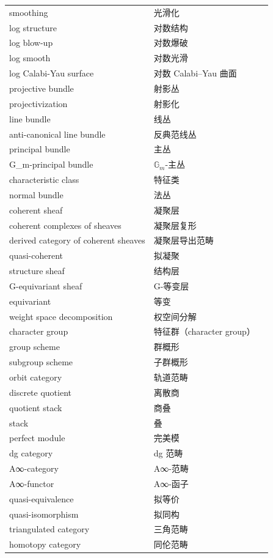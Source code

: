 {\begin{longtable}{p{5.0cm}p{5.6cm}p{3.6cm}}
smoothing & 光滑化 &  \\
log structure & 对数结构 &  \\
log blow-up & 对数爆破 &  \\
log smooth & 对数光滑 &  \\
log Calabi-Yau surface & 对数 Calabi–Yau 曲面 &  \\
projective bundle & 射影丛 &  \\
projectivization & 射影化 &  \\
line bundle & 线丛 &  \\
anti-canonical line bundle & 反典范线丛 &  \\
principal bundle & 主丛 &  \\
G\_m-principal bundle & $\mathbb{G}_m$-主丛 &  \\
characteristic class & 特征类 &  \\
normal bundle & 法丛 &  \\
coherent sheaf & 凝聚层 &  \\
coherent complexes of sheaves & 凝聚层复形 &  \\
derived category of coherent sheaves & 凝聚层导出范畴 &  \\
quasi-coherent & 拟凝聚 &  \\
structure sheaf & 结构层 &  \\
G-equivariant sheaf & G-等变层 &  \\
equivariant & 等变 &  \\
weight space decomposition & 权空间分解 &  \\
character group & 特征群（character group） &  \\
group scheme & 群概形 &  \\
subgroup scheme & 子群概形 &  \\
orbit category & 轨道范畴 &  \\
discrete quotient & 离散商 &  \\
quotient stack & 商叠 &  \\
stack & 叠 &  \\
perfect module & 完美模 &  \\
dg category & dg 范畴 &  \\
A∞-category & A∞-范畴 &  \\
A∞-functor & A∞-函子 &  \\
quasi-equivalence & 拟等价 &  \\
quasi-isomorphism & 拟同构 &  \\
triangulated category & 三角范畴 &  \\
homotopy category & 同伦范畴 &  \\

\end{longtable}}
